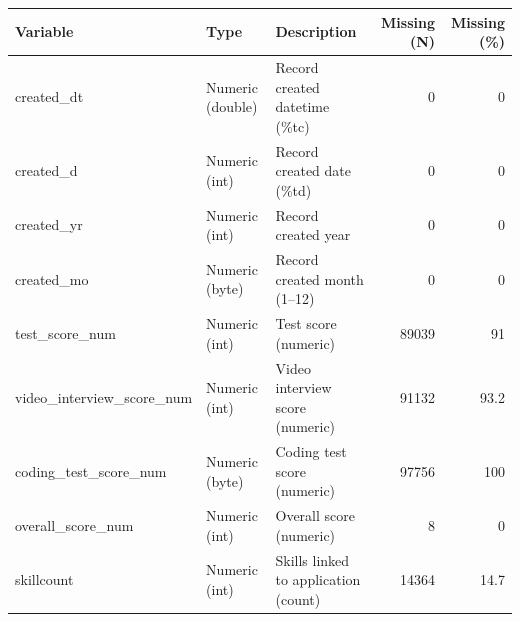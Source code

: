 \begin{threeparttable}


\begin{tabular}{@{}lllrr@{}}


\toprule


\textbf{Variable} & \textbf{Type} & \textbf{Description} & \textbf{Missing (N)} & \textbf{Missing (\%)} \\


\midrule


\midrule
created\_dt & Numeric (double) & Record created datetime (\%tc)&           0&           0\\
created\_d & Numeric (int) & Record created date (\%td)&           0&           0\\
created\_yr & Numeric (int) & Record created year&           0&           0\\
created\_mo & Numeric (byte) & Record created month (1–12)&           0&           0\\
test\_score\_num & Numeric (int) & Test score (numeric)&       89039&          91\\
video\_interview\_score\_num & Numeric (int) & Video interview score (numeric)&       91132&        93.2\\
coding\_test\_score\_num & Numeric (byte) & Coding test score (numeric)&       97756&         100\\
overall\_score\_num & Numeric (int) & Overall score (numeric)&           8&           0\\
skillcount & Numeric (int) & Skills linked to application (count)&       14364&        14.7\\
\bottomrule


\end{tabular}


\end{threeparttable}
